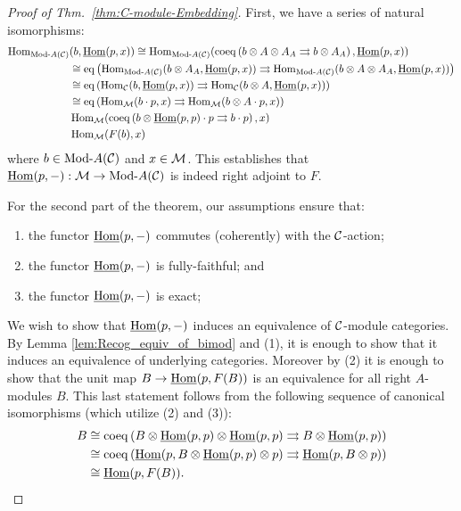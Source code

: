 \documentclass{amsart}
\begin{document}
\begin{proof}[Proof of Thm.~\ref{thm:C-module-Embedding}]
	First, we have a series of natural isomorphisms:
	\begin{align*}
		\Hom_{\Mod{}{A}(\cC)}&(b, \IHom(p,x))  \cong \Hom_{\Mod{}{A}(\cC)}( \coeq \left( b \otimes A \otimes A_A \rightrightarrows b \otimes A_A  \right), \IHom(p,x)) \\
		& \cong \eq \left( \Hom_{\Mod{}{A}(\cC)}(b \otimes A_A, \IHom(p,x) )  \rightrightarrows \Hom_{\Mod{}{A}(\cC)}(  b \otimes A \otimes A_A, \IHom(p,x))  \right) \\
		& \cong \eq \left( \Hom_{\cC}(b, \IHom(p,x) )  \rightrightarrows \Hom_{\cC}(  b \otimes A, \IHom(p,x))  \right) \\
		& \cong \eq \left( \Hom_{\cM}(b \cdot p, x )  \rightrightarrows \Hom_{\cM}(  b \otimes A \cdot p, x)  \right) \\
		& \Hom_{\cM}( \coeq \left( b \otimes \IHom(p,p) \cdot p \rightrightarrows b \cdot p \right), x) \\
		& \Hom_{\cM}( F(b), x)
	\end{align*}
	where $b \in \Mod{}{A}(\cC)$ and $x \in \mathcal M$. This establishes that $\IHom(p,-): \cM \to \Mod{}{A}(\cC)$ is indeed right adjoint to $F$.

For the second part of the theorem, our assumptions ensure that:
\begin{enumerate}
	\item the functor $\operatorname{\underline{Hom}}(p, -)$ commutes (coherently) with the $\mathcal C$-action;
	\item the functor $\operatorname{\underline{Hom}}(p, -)$ is fully-faithful; and
	\item the functor $\operatorname{\underline{Hom}}(p, -)$ is exact; 
\end{enumerate}
We wish to show that $\operatorname{\underline{Hom}}(p, -)$ induces an equivalence of $\mathcal C$-module categories. By Lemma \ref{lem:Recog_equiv_of_bimod} and (1), it is enough to show that it induces an equivalence of underlying categories. Moreover by (2) it is enough to show that the unit map $B \to \operatorname{\underline{Hom}}(p, F(B))$ is an equivalence for all right $A$-modules $B$. This last statement follows from the following sequence of canonical isomorphisms (which utilize (2) and (3)):
\begin{align*}
	B & \cong \operatorname{coeq} \left( B \otimes \operatorname{\underline{Hom}}(p,p) \otimes \operatorname{\underline{Hom}}(p,p) \rightrightarrows B \otimes \operatorname{\underline{Hom}}(p,p) \right)\\
	& \cong \operatorname{coeq} \left(\operatorname{\underline{Hom}}(p,B  \otimes \operatorname{\underline{Hom}}(p,p) \otimes p) \rightrightarrows \operatorname{\underline{Hom}}(p,B \otimes p) \right)\\
	& \cong \operatorname{\underline{Hom}}(p, F(B)). \qedhere
\end{align*}	
\end{proof}
\end{document}
